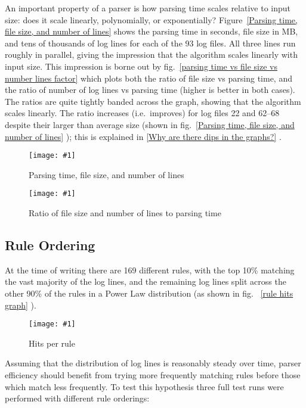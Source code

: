 \documentclass[draft]{svmult}
\newcommand{\showgraph}[3]{%
    \begin{figure}[hbt!]%
        \caption{#2}\label{#3}%
        \texttt{[image: \#1]}%
    \end{figure}%
}
\newcommand{\refwithpage}[1]{%
    \empty{}\vref{#1}%
}
\newcommand{\sectionref}[1]{%
    \textsection{}\vref*{#1}%
}
\newcommand{\refwithlabel}[2]{%
    #1~\vref{#2}%
}
\newcommand{\graphref}[1]{%
    \refwithlabel{fig.}{#1}%
}
\newcommand{\Graphref}[1]{%
    \refwithlabel{Figure}{#1}%
}
\newcommand{\numberOFlogFILES}[0]{%
    93%
}
\newcommand{\numberOFrules}[0]{%
    169%
}
\begin{document}
An important property of a parser is how parsing time scales relative to
input size: does it scale linearly, polynomially, or exponentially?
\Graphref{Parsing time, file size, and number of lines} shows the parsing
time in seconds, file size in MB, and tens of thousands of log lines for
each of the \numberOFlogFILES{} log files.  All three lines run roughly in
parallel, giving the impression that the algorithm scales linearly with
input size.  This impression is borne out by \graphref{parsing time vs file
size vs number lines factor} which plots both the ratio of file size vs
parsing time, and the ratio of number of log lines vs parsing time (higher
is better in both cases).  The ratios are quite tightly banded across the
graph, showing that the algorithm scales linearly.  The ratio increases
(i.e.\ improves) for log files 22 and 62--68 despite their larger than
average size (shown in \graphref{Parsing time, file size, and number of
lines}); this is explained in \sectionref{Why are there dips in the
graphs?}.  \showgraph{build/plot-normal-filesize-numlines}{Parsing time,
file size, and number of lines}{Parsing time, file size, and number of
lines} \showgraph{build/plot-normal-filesize-numlines-factor}{Ratio of file
size and number of lines to parsing time}{parsing time vs file size vs
number lines factor}

\subsection{Rule Ordering}

\label{Rule ordering}
\label{rule ordering for efficiency}
\label{rule efficiency}

At the time of writing there are \numberOFrules{} different rules, with the
top 10\% matching the vast majority of the log lines, and the remaining log
lines split across the other 90\% of the rules in a Power Law distribution
(as shown in fig.~\refwithpage{rule hits graph}).
\showgraph{build/plot-hits}{Hits per rule}{rule hits graph} Assuming that
the distribution of log lines is reasonably steady over time, parser
efficiency should benefit from trying more frequently matching rules before
those which match less frequently.  To test this hypothesis three full test
runs were performed with different rule orderings:
\end{document}
